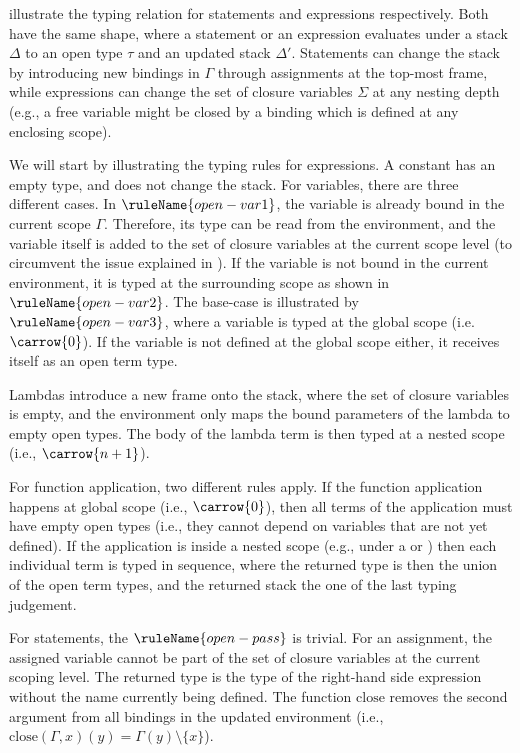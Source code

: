  illustrate the typing relation for statements
and expressions respectively. Both have the same shape, where a statement or an expression evaluates under a
stack $\Delta$ to an open type $\tau$ and an updated stack $\Delta'$. Statements can change the stack by introducing
new bindings in $\Gamma$ through assignments at the top-most frame, while expressions can change the set of closure 
variables $\Sigma$ at any nesting depth (e.g., a free variable might be closed by a binding which is defined at any 
enclosing scope).

We will start by illustrating the typing rules for expressions. A constant has an empty type, and does not change
the stack. For variables, there are three different cases. In $\ruleName{open-var1}$, the variable is
already bound in the current scope $\Gamma$. Therefore, its type can be read from the environment, and the
variable itself is added to the set of closure variables at the current scope level (to circumvent the issue explained in
). If the variable is not bound in the current environment, it is typed at the
surrounding scope as shown in $\ruleName{open-var2}$. The base-case is illustrated by $\ruleName{open-var3}$, where a variable
is typed at the global scope (i.e. $\carrow{0}$). If the variable is not defined at the global scope either, it receives
itself as an open term type.

Lambdas introduce a new frame onto the stack, where the set of closure variables is empty, and the environment only
maps the bound parameters of the lambda to empty open types. The body of the lambda term is then typed at a nested
scope (i.e., $\carrow{n+1}$).

For function application, two different rules apply. If the function application happens at global scope (i.e.,
$\carrow{0}$), then all terms of the application must have empty open types (i.e., they cannot depend on variables
that are not yet defined). If the application is inside a nested scope (e.g., under a  or )
then each individual term is typed in sequence, where the returned type is then the union of the open term types, and
the returned stack the one of the last typing judgement.

For statements, the $\ruleName{open-pass}$ is trivial. For an assignment, the assigned variable cannot be part of the set of
closure variables at the current scoping level. The returned type is the type of the right-hand side expression without
the name currently being defined. The function $\mathrm{close}$ removes the second argument from all bindings in the
updated environment (i.e., $\mathrm{close}(\Gamma, x)(y) = \Gamma(y) \setminus \{x\}$).

